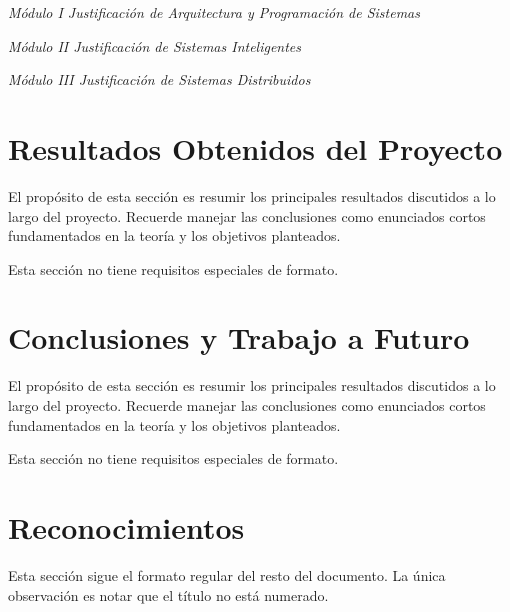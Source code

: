 \noindent
\textit{Módulo I Justificación de Arquitectura y Programación de Sistemas} \par{\vspace{2.25pt}}
\moduloText \par{\vspace{9.9pt}}

\noindent
\textit{Módulo II Justificación de Sistemas Inteligentes} \par{\vspace{2.25pt}}
\moduloText \par{\vspace{9.9pt}}

\noindent
\textit{Módulo III Justificación de Sistemas Distribuidos} \par{\vspace{2.25pt}}
\moduloText

\section{Resultados Obtenidos del Proyecto}
El propósito de esta sección es resumir los principales resultados discutidos a lo
largo del proyecto. Recuerde manejar las conclusiones como enunciados cortos
fundamentados en la teoría y los objetivos planteados.

Esta sección no tiene requisitos especiales de formato.

\section{Conclusiones y Trabajo a Futuro}
El propósito de esta sección es resumir los principales resultados discutidos a
lo largo del proyecto. Recuerde manejar las conclusiones como enunciados cortos fundamentados
en la teoría y los objetivos planteados.

Esta sección no tiene requisitos especiales de formato.

\section{Reconocimientos}
Esta sección sigue el formato regular del resto del documento. La única
observación es notar que el título no está numerado.


\nocite{*} %

\clearpage




